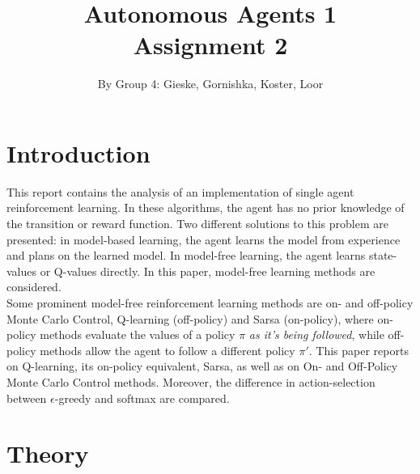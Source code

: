 \documentclass{article}
\begin{document}
\title{Autonomous Agents 1 \\ Assignment 2}

\author{By Group 4: Gieske, Gornishka, Koster, Loor}
\maketitle
\pagebreak
\tableofcontents


\pagebreak

\section{Introduction}
This report contains the analysis of an implementation of single agent reinforcement learning. In these algorithms, the agent has no prior knowledge of the transition or reward function. Two different solutions to this problem are presented: in model-based learning, the agent learns the model from experience and plans on the learned model. In model-free learning, the agent learns state-values or Q-values directly. In this paper, model-free learning methods are considered.\\
Some prominent model-free reinforcement learning methods are on- and off-policy Monte Carlo Control, Q-learning (off-policy) and Sarsa (on-policy), where on-policy methods evaluate the values of a policy $\pi$ \textit{as it's being followed}, while off-policy methods allow the agent to follow a different policy $\pi'$. This paper reports on Q-learning, its on-policy equivalent, Sarsa, as well as on On- and Off-Policy Monte Carlo Control methods. Moreover, the difference in action-selection between $\epsilon$-greedy and softmax are compared. 
\pagebreak

\section{Theory}
\end{document}
